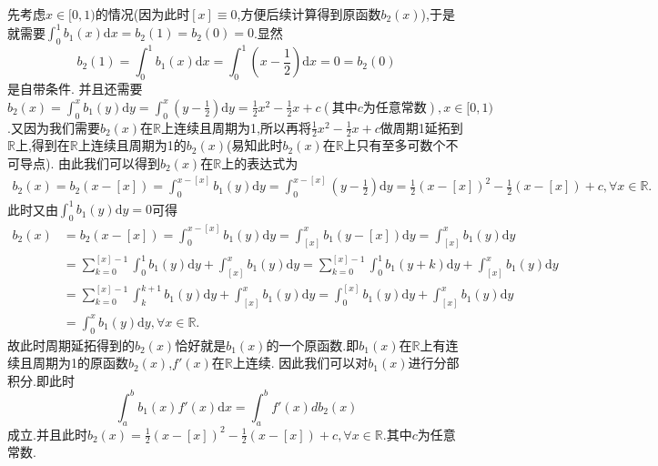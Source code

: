 \documentclass[../../main.tex]{subfiles}%
\begin{document}
\begin{remark}
先考虑$x\in [0,1)$的情况(因为此时$[x]\equiv0$,方便后续计算得到原函数$b_2(x)$),于是就需要\(\int_0^1{b_1(x)\mathrm{d}x}=b_2\left( 1 \right) =b_2\left( 0 \right) =0\).显然
\[
b_2(1)=\int_{0}^{1}b_1(x)\mathrm{d}x=\int_{0}^{1}\left(x-\frac{1}{2}\right)\mathrm{d}x = 0 =b_2(0)
\]
是自带条件.
并且还需要\(b_2(x)=\int_0^x{b_1\left( y \right) \mathrm{d}y}=\int_0^x{\left( y-\frac{1}{2} \right) \mathrm{d}y}=\frac{1}{2}x^2-\frac{1}{2}x + c(\text{其中}c\text{为任意常数}),x\in[0,1)\).又因为我们需要$b_2(x)$在$\mathbb{R}$上连续且周期为1,所以再将$\frac{1}{2}x^2-\frac{1}{2}x + c$做周期1延拓到$\mathbb{R}$上,得到在$\mathbb{R}$上连续且周期为1的$b_2(x)$(易知此时$b_2(x)$在$\mathbb{R}$上只有至多可数个不可导点).
由此我们可以得到$b_2(x)$在$\mathbb{R}$上的表达式为
\begin{align*}
b_2\left( x \right) =b_2\left( x-\left[ x \right] \right) =\int_0^{x-\left[ x \right]}{b_1\left( y \right) \mathrm{d}y}=\int_0^{x-\left[ x \right]}{\left( y-\frac{1}{2} \right) \mathrm{d}y}=\frac{1}{2}\left( x-\left[ x \right] \right) ^2-\frac{1}{2}\left( x-\left[ x \right] \right) +c,\forall x\in \mathbb{R} .
\end{align*}
此时又由$\int_0^1{b_1\left( y \right) \mathrm{d}y}=0$可得
\begin{align*}
b_2\left( x \right) &=b_2\left( x-\left[ x \right] \right) =\int_0^{x-\left[ x \right]}{b_1\left( y \right) \mathrm{d}y}=\int_{\left[ x \right]}^x{b_1\left( y-\left[ x \right] \right) \mathrm{d}y}=\int_{\left[ x \right]}^x{b_1\left( y \right) \mathrm{d}y}
\\
&=\sum\limits_{k=0}^{\left[ x \right] -1}{\int_0^1{b_1\left( y \right) \mathrm{d}y}}+\int_{\left[ x \right]}^x{b_1\left( y \right) \mathrm{d}y}=\sum\limits_{k=0}^{\left[ x \right] -1}{\int_0^1{b_1\left( y+k \right) \mathrm{d}y}}+\int_{\left[ x \right]}^x{b_1\left( y \right) \mathrm{d}y}
\\
&=\sum\limits_{k=0}^{\left[ x \right] -1}{\int_k^{k+1}{b_1\left( y \right) \mathrm{d}y}}+\int_{\left[ x \right]}^x{b_1\left( y \right) \mathrm{d}y}=\int_0^{\left[ x \right]}{b_1\left( y \right) \mathrm{d}y}+\int_{\left[ x \right]}^x{b_1\left( y \right) \mathrm{d}y}
\\
&=\int_0^x{b_1\left( y \right) \mathrm{d}y},\forall x\in \mathbb{R}.
\end{align*}
故此时周期延拓得到的$b_2(x)$恰好就是$b_1(x)$的一个原函数.即$b_1(x)$在$\mathbb{R}$上有连续且周期为1的原函数$b_2(x)$,$f'(x)$在$\mathbb{R}$上连续.
因此我们可以对$b_1(x)$进行分部积分.即此时
\[
\int_{a}^{b}b_1(x)f'(x)\mathrm{d}x=\int_{a}^{b}f'(x)db_2(x)
\]
成立.并且此时$ b_2\left( x \right)=\frac{1}{2}\left( x-\left[ x \right] \right) ^2-\frac{1}{2}\left( x-\left[ x \right] \right) +c,\forall x\in \mathbb{R}$.其中$c$为任意常数.


\end{remark}
\end{document}

